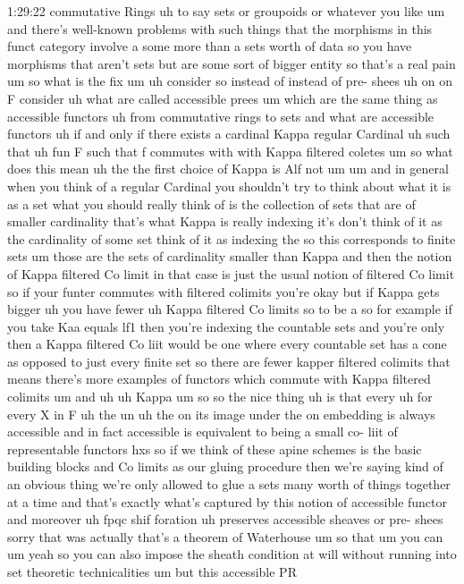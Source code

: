 \begin{unfinished}{1:29:22}
commutative Rings uh to say sets or
groupoids or whatever you like um and
there's well-known problems with such
things that the
morphisms in this funct category involve
a some more than a sets worth of data so
you have morphisms that aren't sets but
are some sort of bigger entity so that's
a real pain um so what is the
fix
um uh consider so instead
of instead of pre- shees uh on on F
consider uh what are called accessible
prees
um which are the same thing as
accessible
functors uh from commutative rings to
sets and what are accessible
functors
uh if and only if there exists a
cardinal Kappa regular
Cardinal uh such that uh fun F such that
f commutes
with with Kappa filtered
coletes
um so what does this mean uh the the
first choice of Kappa is Alf not
um um and in general when you think of a
regular Cardinal you shouldn't try to
think about what it is as a set what you
should really think of is the collection
of sets that are of smaller cardinality
that's what Kappa is really indexing
it's don't think of it as the
cardinality of some set think of it as
indexing the so this corresponds to
finite
sets um those are the sets of
cardinality smaller than Kappa and then
the notion of Kappa filtered Co limit in
that case is just the usual notion of
filtered Co limit so if your funter
commutes with filtered colimits you're
okay but if Kappa gets
bigger uh you have
fewer uh Kappa filtered Co
limits so to be a so for example if you
take Kaa equals lf1 then you're indexing
the countable
sets and you're only then a Kappa
filtered Co liit would be one where
every countable set has a cone as
opposed to just every finite set so
there are fewer kapper filtered colimits
that means there's more examples of
functors which commute with Kappa
filtered
colimits um and
uh uh
Kappa um so so the nice thing uh is that
every uh for
every X in
F uh the un
uh the on its image under the on
embedding is always
accessible and in
fact
accessible is equivalent to being a
small co-
liit of representable functors
hxs so if we think of
these apine schemes is the basic
building blocks and Co limits as our
gluing procedure then we're saying kind
of an obvious thing we're only allowed
to glue a sets many worth of things
together at a time and that's exactly
what's captured by this notion of
accessible
functor and
moreover uh fpqc shif
foration uh preserves accessible sheaves
or pre- shees
sorry that was actually that's a theorem
of
Waterhouse
um so that um
you can um yeah so you can also impose
the sheath condition at will without
running into set theoretic
technicalities um but this accessible PR

\end{unfinished}
